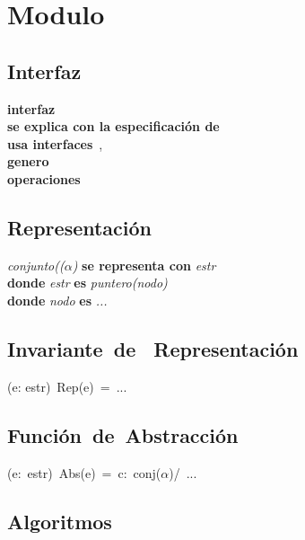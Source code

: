 \section*{Modulo }

\vspace{22pt}

\subsection*{Interfaz}
\textbf{interfaz}\ \\
\textbf{se explica con la especificaci\'on de}\ \\
\textbf{usa interfaces}\ , \\
\textbf{genero}\ \\
\textbf{operaciones}\\

\subsection*{Representaci\'on}
\textit{conjunto(($\alpha$)} \textbf{se representa con} \textit{estr}\\
\textbf{donde} \textit{estr} \textbf{es} \textit{puntero(nodo)}\\
\textbf{donde} \textit{nodo} \textbf{es} \textit{...}\\

\subsection*{Invariante\ de \ Representaci\'on}
\vspace{11pt}
(\forall e: estr)\ Rep(e)\ =\ ...
\vspace{33pt}

\subsection*{Funci\'on\ de\ Abstracci\'on}
\vspace{11pt}
(\forall e:\ estr)\ Abs(e)\ =\ c:\ conj($\alpha$)/\ ...
\vspace{33pt}

\subsection*{Algoritmos}